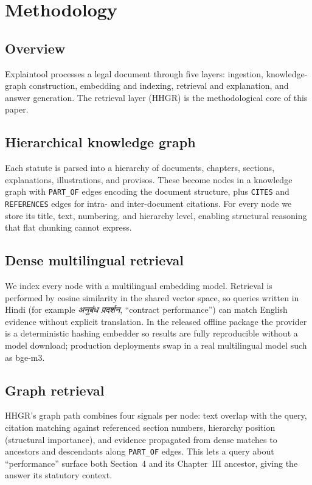 \section{Methodology}

\subsection{Overview}

Explaintool processes a legal document through five layers: ingestion,
knowledge-graph construction, embedding and indexing, retrieval and
explanation, and answer generation. The retrieval layer (HHGR) is the
methodological core of this paper.

\subsection{Hierarchical knowledge graph}

Each statute is parsed into a hierarchy of documents, chapters, sections,
explanations, illustrations, and provisos. These become nodes in a knowledge
graph with \texttt{PART\_OF} edges encoding the document structure, plus
\texttt{CITES} and \texttt{REFERENCES} edges for intra- and inter-document
citations. For every node we store its title, text, numbering, and hierarchy
level, enabling structural reasoning that flat chunking cannot express.

\subsection{Dense multilingual retrieval}

We index every node with a multilingual embedding model. Retrieval is performed
by cosine similarity in the shared vector space, so queries written in Hindi
(for example \emph{अनुबंध प्रदर्शन}, ``contract performance'') can match English
evidence without explicit translation. In the released offline package the
provider is a deterministic hashing embedder so results are fully reproducible
without a model download; production deployments swap in a real multilingual
model such as bge-m3.

\subsection{Graph retrieval}

HHGR's graph path combines four signals per node: text overlap with the query,
citation matching against referenced section numbers, hierarchy position
(structural importance), and evidence propagated from dense matches to
ancestors and descendants along \texttt{PART\_OF} edges. This lets a query about
``performance'' surface both Section~4 and its Chapter~III ancestor, giving the
answer its statutory context.

